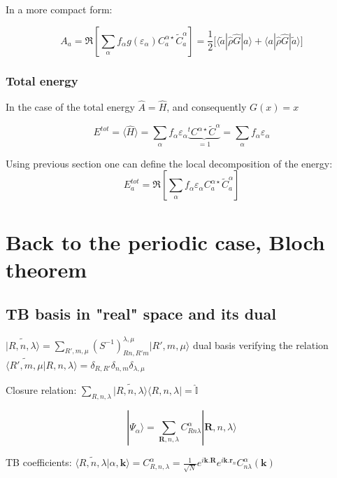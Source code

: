 \documentclass{article}
\newcommand{\bra}[1]{\langle #1|}
\newcommand{\ket}[1]{|#1\rangle}
\newcommand{\op}[1]{\hat{#1}}
\begin{document}
\noindent
In a more compact form:

\[ {A}_{a} =\Re \left[ 
\sum_{\alpha} f_{\alpha}g(\varepsilon_{\alpha}) 
C_{a}^{\alpha \star}\widetilde{C}_{a}^{\alpha} \right]= 
\frac{1}{2} \Big[ \bra{\tilde{a}} \op{\rho}\op{G} \ket{a} + \bra{a} \op{\rho}\op{G} \ket{\tilde{a}}  \Big]
 \]

\subsubsection{Total energy}

\noindent
In the case of the total energy $\op{A}=\op{H}$, and consequently $G(x)=x$

\[E^{tot}=\langle \op{H} \rangle=\sum_{\alpha } f_{\alpha}\varepsilon_{\alpha}
\underbrace{^tC^{\alpha \star}\widetilde{C}^{\alpha}}_{=1}= \sum_{\alpha } f_{\alpha}\varepsilon_{\alpha}\]

\noindent
Using previous section one can define the local decomposition of the energy:
\[ E^{tot}_{a} =\Re \left[ 
\sum_{\alpha} f_{\alpha}\varepsilon_{\alpha}
C_{a}^{\alpha \star}\widetilde{C}_{a}^{\alpha} \right]
 \]
    
\section{Back to the periodic case, Bloch theorem}

\subsection{TB basis in "real" space and its dual}

\noindent
$\displaystyle \widetilde{\ket{R,n,\lambda}} =\sum_{R',m,\mu} 
(S^{-1})_{Rn,R'm}^{\lambda, \mu} \ket{R',m,\mu}$ dual basis
verifying the relation $ 
\widetilde{\bra{R',m,\mu}}R,n,\lambda\rangle=\delta_{R,R'}\delta_{n,m}\delta_{\lambda,\mu}$ 


\noindent
Closure relation: $\displaystyle \sum_{R,n,\lambda} 
\widetilde{\ket{R,n,\lambda}}\bra{R,n,\lambda}=\op{\mathbb{I}}$

\[\displaystyle \ket{\Psi_{\alpha}}=\sum_{\mathbf{R},n,\lambda} C_{R n  \lambda}^{\alpha} \ket{\mathbf{R},n,\lambda }\]

\noindent
TB coefficients: $\langle \widetilde{R,n,\lambda}|\alpha, 
\mathbf{k} \rangle= C_{R,n,\lambda}^{\alpha}=\frac{1}{\sqrt{N}}e^{i  \mathbf{k}.\mathbf{R}}e^{i \mathbf{k}.\mathbf{r}_n} C_{n \lambda}^{\alpha}(\mathbf{k})$
\end{document}
